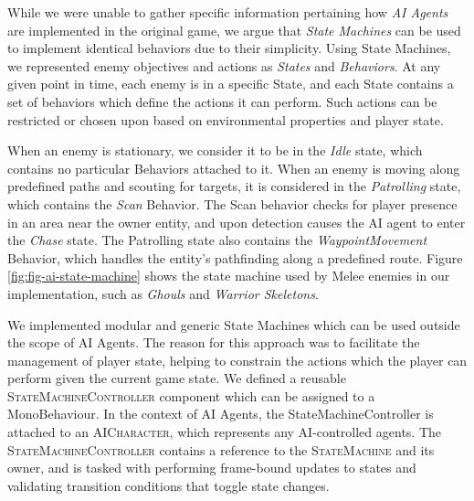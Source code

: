 While we were unable to gather specific information pertaining how \emph{AI Agents} are implemented in the original game, we argue that \emph{State Machines} can be used to implement identical behaviors due to their simplicity. Using State Machines, we represented enemy objectives and actions as \emph{States} and \emph{Behaviors}. At any given point in time, each enemy is in a specific State, and each State contains a set of behaviors which define the actions it can perform. Such actions can be restricted or chosen upon based on environmental properties and player state.

When an enemy is stationary, we consider it to be in the \emph{Idle} state, which contains no particular Behaviors attached to it. When an enemy is moving along predefined paths and scouting for targets, it is considered in the \emph{Patrolling} state, which contains the \emph{Scan} Behavior. The Scan behavior checks for player presence in an area near the owner entity, and upon detection causes the AI agent to enter the \emph{Chase} state. The Patrolling state also contains the \emph{WaypointMovement} Behavior, which handles the entity's pathfinding along a predefined route. Figure \ref{fig:fig-ai-state-machine} shows the state machine used by Melee enemies in our implementation, such as \emph{Ghouls} and \emph{Warrior Skeletons}.



We implemented modular and generic State Machines which can be used outside the scope of AI Agents. The reason for this approach was to facilitate the management of player state, helping to constrain the actions which the player can perform given the current game state. We defined a reusable \textsc{StateMachineController} component which can be assigned to a MonoBehaviour. In the context of AI Agents, the StateMachineController is attached to an \textsc{AICharacter}, which represents any AI-controlled agents. The \textsc{StateMachineController} contains a reference to the \textsc{StateMachine} and its owner, and is tasked with performing frame-bound updates to states and validating transition conditions that toggle state changes.

